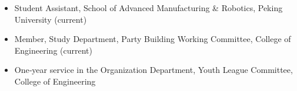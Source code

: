 
\begin{itemize}[parsep=0.7ex, leftmargin=1.5em]
  \item Student Assistant, School of Advanced Manufacturing \& Robotics, Peking University (current)
  \item Member, Study Department, Party Building Working Committee, College of Engineering (current)
  \item One‑year service in the Organization Department, Youth League Committee, College of Engineering
\end{itemize}


